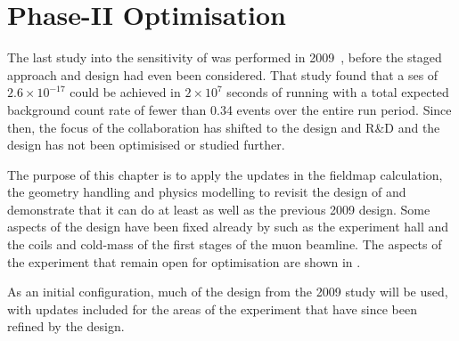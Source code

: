 
\chapter{Phase-II Optimisation}
The last study into the sensitivity of \COMET \phaseII was performed in 2009~\cite{CDRphase2}, before the staged approach and \phaseI design had even been considered.
That study found that a \ac{ses} of $2.6\times10^{-17}$ could be achieved in $2\times10^{7}$ seconds of running with a total expected background count rate of fewer than 0.34 events over the entire run period.
Since then, the focus of the collaboration has shifted to the \phaseI design and R\&D and the \phaseII design has not been optimisised or studied further.

The purpose of this chapter is to apply the updates in the fieldmap calculation, the geometry handling and physics modelling to revisit the design of \phaseII and demonstrate that it can do at least as well as the previous 2009 design.
Some aspects of the design have been fixed already by \phaseI such as the experiment hall and the coils and cold-mass of the first stages of the muon beamline.
The aspects of the experiment that remain open for optimisation are shown in .

\TabOptimisationParameters
As an initial configuration, much of the design from the 2009 study will be used, with updates included for the areas of the experiment that have since been refined by the \phaseI design.

